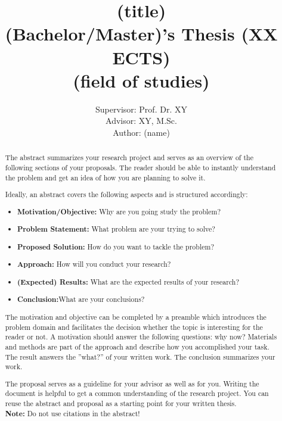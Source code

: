 \documentclass[a4paper]{article}
\title{
(title) \\
\small{(Bachelor/Master)'s Thesis (XX ECTS)} \\
\small{(field of studies)}}
\author{
Supervisor: Prof. Dr.  XY\\
Advisor: XY, M.Sc.\\
Author: (name)
}
\begin{document}
\maketitle

\begin{abstract}
The abstract summarizes your research project and serves as an overview of the following sections of your proposals.
The reader should be able to instantly understand the problem and get an idea of how you are planning to solve it.

Ideally, an abstract covers the following aspects and is structured accordingly:

\begin{itemize}
	\item \textbf{Motivation/Objective:} Why are you going study the problem? 
	\item \textbf{Problem Statement:} What problem are your trying to solve? 
	\item \textbf{Proposed Solution:} How do you want to tackle the problem? 
	\item \textbf{Approach:} How will you conduct your research?
	\item \textbf{(Expected) Results:} What are the expected results of your research? 
	\item \textbf{Conclusion:}What are your conclusions? 
\end{itemize}

The motivation and objective can be completed by a preamble which introduces the problem domain and facilitates the decision whether the topic is interesting for the reader or not.
A motivation should answer the following questions: why now?
Materials and methods are part of the approach and describe how you accomplished your task.
The result answers the ''what?'' of your written work.
The conclusion summarizes your work.

The proposal serves as a guideline for your advisor as well as for you.
Writing the document is helpful to get a common understanding of the research project.
You can reuse the abstract and proposal as a starting point for your written thesis.\\

\noindent \textbf{Note:} Do not use citations in the abstract! \\ 

\end{abstract}

\newpage

\end{document}
